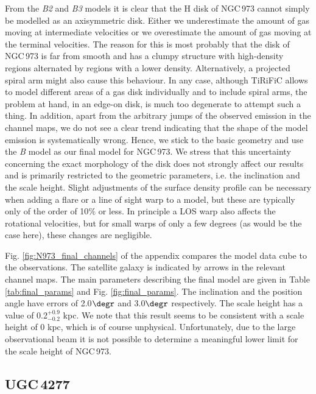 \documentclass{aa}
\begin{document}
From the \emph{B2} and \emph{B3} models it is clear that the H{} disk of NGC\,973 cannot simply be modelled as an axisymmetric disk. Either we underestimate the amount of gas moving at intermediate velocities or we overestimate the amount of gas moving at the terminal velocities. The reason for this is most probably that the disk of NGC\,973 is far from smooth and has a clumpy structure with high-density regions alternated by regions with a lower density. Alternatively, a projected spiral arm might also cause this behaviour. In any case, although TiRiFiC allows to model different areas of a gas disk individually and to include spiral arms, the problem at hand, in an edge-on disk, is much too degenerate to attempt such a thing. In addition, apart from the arbitrary jumps of the observed emission in the channel maps, we do not see a clear trend indicating that the shape of the model emission is systematically wrong. Hence, we stick to the basic geometry and use the \emph{B} model as our final model for NGC\,973. We stress that this uncertainty concerning the exact morphology of the disk does not strongly affect our results and is primarily restricted to the geometric parameters, i.e. the inclination and the scale height. Slight adjustments of the surface density profile can be necessary when adding a flare or a line of sight warp to a model, but these are typically only of the order of 10$\%$ or less. In principle a LOS warp also affects the rotational velocities, but for small warps of only a few degrees (as would be the case here), these changes are negligible. 
\par
Fig. \ref{fig:N973_final_channels} of the appendix compares the model data cube to the observations. The satellite galaxy is indicated by arrows in the relevant channel maps. The main parameters describing the final model are given in Table \ref{tab:final_params} and Fig. \ref{fig:final_params}. The inclination and the position angle have errors of 2.0$\degr$ and 3.0$\degr$ respectively. The scale height has a value of 0.2$^{+0.9}_{-0.2}$ kpc. We note that this result seems to be consistent with a scale height of 0 kpc, which is of course unphysical. Unfortunately, due to the large observational beam it is not possible to determine a meaningful lower limit for the scale height of NGC\,973.


\subsection{UGC\,4277}
\end{document}
